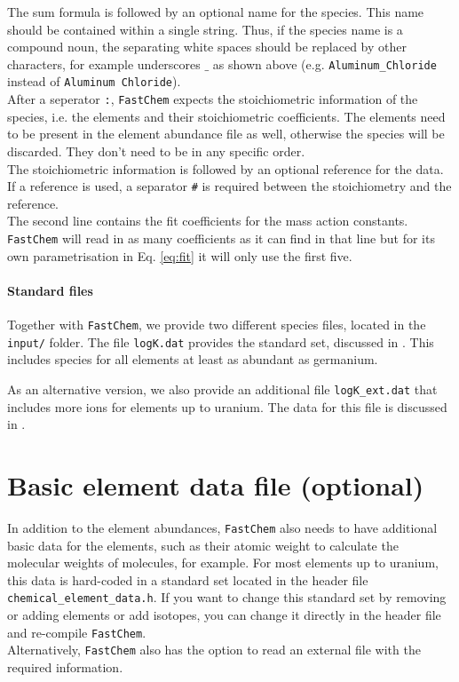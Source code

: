 \documentclass[numbers=noenddot]{fcmanual}
\newcommand{\fc}{\texttt{FastChem}\xspace}
\begin{document}
The sum formula is followed by an optional name for the species. This name should be contained within a single string. Thus, if the species name is a compound noun, the separating white spaces should be replaced by other characters, for example underscores $\_$ as shown above (e.g. \verb|Aluminum_Chloride| instead of \verb|Aluminum Chloride|). \\

After a seperator \verb|:|, \fc expects the stoichiometric information of the species, i.e. the elements and their stoichiometric coefficients. The elements need to be present in the element abundance file as well, otherwise the species will be discarded. They don't need to be in any specific order.\\
The stoichiometric information is followed by an optional reference for the data. If a reference is used, a separator \verb|#| is required between the stoichiometry and the reference.\\

The second line contains the fit coefficients for the mass action constants. \fc will read in as many coefficients as it can find in that line but for its own parametrisation in Eq. \eqref{eq:fit} it will only use the first five.

\paragraph{Standard files}
Together with \fc, we provide two different species files, located in the \verb|input/| folder. The file \verb|logK.dat| provides the standard set, discussed in \citet{Stock2018MNRAS.479..865S}. This includes species for all elements at least as abundant as germanium.

As an alternative version, we also provide an additional file \verb|logK_ext.dat| that includes more ions for elements up to uranium. The data for this file is discussed in \citet{Hoeijmakers2019A&A...627A.165H}.

\newpage
\section{Basic element data file (optional)}
In addition to the element abundances, \fc also needs to have additional basic data for the elements, such as their atomic weight to calculate the molecular weights of molecules, for example. For most elements up to uranium, this data is hard-coded in a standard set located in the header file \verb|chemical_element_data.h|. If you want to change this standard set by removing or adding elements or add isotopes, you can change it directly in the header file and re-compile \fc.\\
Alternatively, \fc also has the option to read an external file with the required information.
\end{document}
